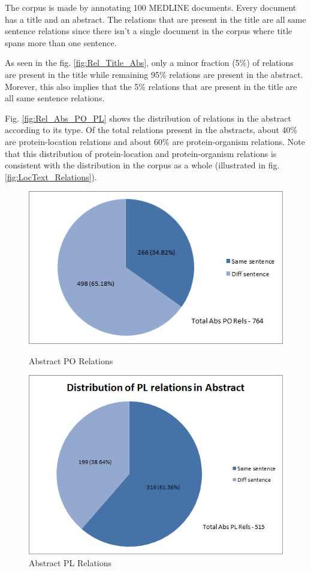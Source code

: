 The corpus is made by annotating 100 MEDLINE documents. Every document has a title and an abstract. The relations that are present in the title are all same sentence relations since there isn't a single document in the corpus where title spans more than one sentence.

As seen in the fig. \ref{fig:Rel_Title_Abs}, only a minor fraction (5\%) of relations are present in the title while remaining 95\% relations are present in the abstract. Morever, this also implies that the 5\% relations that are present in the title are all same sentence relations.

Fig. \ref{fig:Rel_Abs_PO_PL} shows the distribution of relations in the abstract according to its type. Of the total relations present in the abstracts, about 40\% are protein-location relations and about 60\% are protein-organism relations. Note that this distribution of protein-location and protein-organism relations is consistent with the distribution in the corpus as a whole (illustrated in fig. \ref{fig:LocText_Relations}).

\begin{figure}
\centering
\begin{minipage}{.5\textwidth}
  \centering
  \includegraphics[width=.95\textwidth]{figures/AbsPORels_sent_Distribution.png}
  \caption{Abstract PO Relations}
  \label{fig:Abs_PO_Rel}
\end{minipage}%
\begin{minipage}{.5\textwidth}
  \centering
  \includegraphics[width=.95\textwidth]{figures/AbsPLRels_sent_Distribution.png}
  \caption{Abstract PL Relations}
  \label{fig:Abs_PL_Rel}
\end{minipage}
\end{figure}


